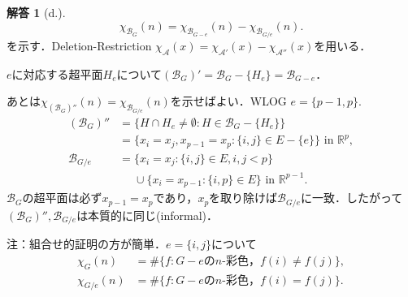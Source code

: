 \documentclass[xelatex,ja=standard,a4paper,14pt,everyparhook=compat]{bxjsarticle}
\newcommand{\bbR}{\mathbb{R}}
\newcommand{\mcA}{\mathcal{A}}
\newcommand{\mcB}{\mathcal{B}}
\theoremstyle{definition}
\newtheorem*{answer}{解答}
\begin{document}
\begin{answer}[d.]
    \begin{equation*}
        \chi_{\mcB_G}(n) = \chi_{\mcB_{G-e}}(n) - \chi_{\mcB_{G/e}}(n).
    \end{equation*}
    を示す．Deletion-Restriction $\chi_{\mcA}(x) = \chi_{\mcA'}(x) - \chi_{\mcA''}(x)$を用いる．

    $e$に対応する超平面$H_e$について$(\mcB_G)' = \mcB_G - \{H_e\} = \mcB_{G-e}$．

    あとは$\chi_{(\mcB_G)''}(n) = \chi_{\mcB_{G/e}}(n)$を示せばよい．WLOG $e=\{p-1,p\}$. \begin{align*}
        (\mcB_G)'' &= \{H \cap H_e \neq \emptyset : H \in \mcB_G - \{H_e\}\} \\
            &= \{x_i = x_j, x_{p-1} = x_p : \{i,j\} \in E - \{e\}\}\text{ in $\bbR^p$}, \\
        \mcB_{G/e} &= \{x_i=x_j : \{i,j\} \in E, i,j < p\} \\
        &\phantom{{}={}}\cup \{x_i=x_{p-1} : \{i,p\} \in E\}\text{ in $\bbR^{p-1}$}.
    \end{align*}
    $\mcB_G$の超平面は必ず$x_{p-1} = x_p$であり，$x_p$を取り除けば$\mcB_{G/e}$に一致．したがって$(\mcB_G)'',\mcB_{G/e}$は本質的に同じ(informal)．

    注：組合せ的証明の方が簡単．$e=\{i,j\}$について \begin{align*}
        \chi_G(n) &= \#\{f : \text{$G-e$の$n$-彩色，$f(i) \neq f(j)$}\}, \\
        \chi_{G/e}(n) &= \#\{f : \text{$G-e$の$n$-彩色，$f(i) = f(j)$}\}.
    \end{align*}
\end{answer}
\end{document}
